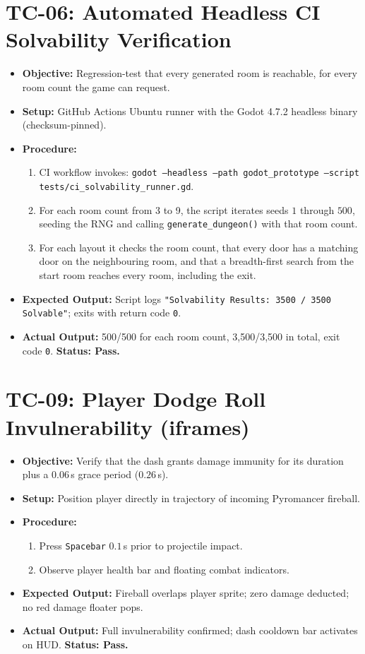 \section{TC-06: Automated Headless CI Solvability Verification}
\begin{itemize}
    \item \textbf{Objective:} Regression-test that every generated room is reachable, for every room count the game can request.
    \item \textbf{Setup:} GitHub Actions Ubuntu runner with the Godot 4.7.2 headless binary (checksum-pinned).
    \item \textbf{Procedure:}
    \begin{enumerate}
        \item CI workflow invokes: \texttt{godot --headless --path godot\_prototype --script tests/ci\_solvability\_runner.gd}.
        \item For each room count from 3 to 9, the script iterates seeds $1$ through $500$, seeding the RNG and calling \texttt{generate\_dungeon()} with that room count.
        \item For each layout it checks the room count, that every door has a matching door on the neighbouring room, and that a breadth-first search from the start room reaches every room, including the exit.
    \end{enumerate}
    \item \textbf{Expected Output:} Script logs \texttt{"Solvability Results: 3500 / 3500 Solvable"}; exits with return code \texttt{0}.
    \item \textbf{Actual Output:} 500/500 for each room count, 3,500/3,500 in total, exit code \texttt{0}. \textbf{Status: Pass.}
\end{itemize}

\section{TC-09: Player Dodge Roll Invulnerability (iframes)}
\begin{itemize}
    \item \textbf{Objective:} Verify that the dash grants damage immunity for its duration plus a $0.06$\,s grace period ($0.26$\,s).
    \item \textbf{Setup:} Position player directly in trajectory of incoming Pyromancer fireball.
    \item \textbf{Procedure:}
    \begin{enumerate}
        \item Press \texttt{Spacebar} $0.1$\,s prior to projectile impact.
        \item Observe player health bar and floating combat indicators.
    \end{enumerate}
    \item \textbf{Expected Output:} Fireball overlaps player sprite; zero damage deducted; no red damage floater pops.
    \item \textbf{Actual Output:} Full invulnerability confirmed; dash cooldown bar activates on HUD. \textbf{Status: Pass.}
\end{itemize}
